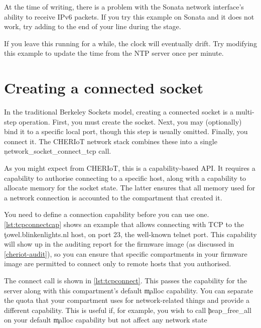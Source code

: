 {\begin{note}
At the time of writing, there is a problem with the Sonata network interface's ability to receive IPv6 packets.
If you try this example on Sonata and it does not work, try adding  to the end of your  line during the  stage.
\end{note}

If you leave this running for a while, the clock will eventually drift.
Try modifying this example to update the time from the NTP server once per minute.

\section{Creating a connected socket}

In the traditional Berkeley Sockets model, creating a connected socket is a multi-step operation.
First, you must create the socket.
Next, you may (optionally) bind it to a specific local port, though this step is usually omitted.
Finally, you connect it.
The CHERIoT network stack combines these into a single \c{network_socket_connect_tcp} call.


As you might expect from CHERIoT, this is a capability-based API.
It requires a capability to authorise connecting to a specific host, along with a capability to allocate memory for the socket state.
The latter ensures that all memory used for a network connection is accounted to the compartment that created it.

You need to define a connection capability before you can use one.
\ref{lst:tcpconnectcap} shows an example that allows connecting with TCP to the \c{towel.blinkenlights.nl} host, on port 23, the well-known telnet port.
This capability will show up in the auditing report for the firmware image (as discussed in \ref{cheriot-audit}), so you can ensure that specific compartments in your firmware image are permitted to connect only to remote hosts that you authorised.

\codelisting[filename=examples/tcp/tcp.cc,marker=server_capability,label=lst:tcpconnectcap,caption="A static capability that authorises connecting to a remote server."]{}

The connect call is shown in \ref{lst:tcpconnect}.
This passes the capability for the server along with this compartment's default \c{malloc} capability.
You can separate the quota that your compartment uses for network-related things and provide a different capability.
This is useful if, for example, you wish to call \c{heap_free_all} on your default \c{malloc} capability but not affect any network state

}
